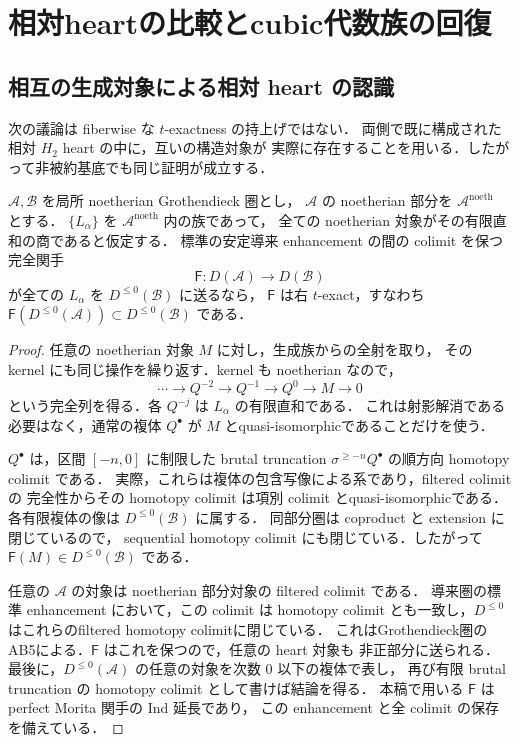 \section{相対heartの比較とcubic代数族の回復}
\label{sec:qa-relative-avatar-heart-comparison}

\subsection{相互の生成対象による相対 heart の認識}
\label{subsec:qa-relative-mutual-heart-recognition}

次の議論は fiberwise な $t$-exactness の持上げではない．
両側で既に構成された相対 $H_2$ heart の中に，互いの構造対象が
実際に存在することを用いる．したがって非被約基底でも同じ証明が成立する．

\begin{lemma}[生成族に対する非正性の検出]
\label{lem:qa-generators-detect-right-texactness}
$\mathcal A,\mathcal B$ を局所 noetherian Grothendieck 圏とし，
$\mathcal A$ の noetherian 部分を $\mathcal A^{\mathrm{noeth}}$ とする．
$\{L_\alpha\}$ を $\mathcal A^{\mathrm{noeth}}$ 内の族であって，
全ての noetherian 対象がその有限直和の商であると仮定する．
標準の安定導来 enhancement の間の colimit を保つ完全関手
\[
 \mathsf F:D(\mathcal A)\longrightarrow D(\mathcal B)
\]
が全ての $L_\alpha$ を $D^{\leq0}(\mathcal B)$ に送るなら，
$\mathsf F$ は右 $t$-exact，すなわち
$\mathsf F(D^{\leq0}(\mathcal A))\subset D^{\leq0}(\mathcal B)$ である．
\end{lemma}
\begin{proof}
任意の noetherian 対象 $M$ に対し，生成族からの全射を取り，
その kernel にも同じ操作を繰り返す．kernel も noetherian なので，
\[
 \cdots\longrightarrow Q^{-2}\longrightarrow Q^{-1}
       \longrightarrow Q^0\longrightarrow M\longrightarrow0
\]
という完全列を得る．各 $Q^{-j}$ は $L_\alpha$ の有限直和である．
これは射影解消である必要はなく，通常の複体 $Q^\bullet$ が
$M$ とquasi-isomorphicであることだけを使う．

$Q^\bullet$ は，区間 $[-n,0]$ に制限した brutal truncation
$\sigma^{\geq-n}Q^\bullet$ の順方向 homotopy colimit である．
実際，これらは複体の包含写像による系であり，filtered colimit の
完全性からその homotopy colimit は項別 colimit とquasi-isomorphicである．
各有限複体の像は $D^{\leq0}(\mathcal B)$ に属する．
同部分圏は coproduct と extension に閉じているので，
sequential homotopy colimit にも閉じている．したがって
$\mathsf F(M)\in D^{\leq0}(\mathcal B)$ である．

任意の $\mathcal A$ の対象は noetherian 部分対象の filtered colimit である．
導来圏の標準 enhancement において，この colimit は homotopy colimit
とも一致し，$D^{\leq0}$ はこれらのfiltered homotopy colimitに閉じている．
これはGrothendieck圏のAB5による．$\mathsf F$ はこれを保つので，任意の heart 対象も
非正部分に送られる．
最後に，$D^{\leq0}(\mathcal A)$ の任意の対象を次数 $0$ 以下の複体で表し，
再び有限 brutal truncation の homotopy colimit として書けば結論を得る．
本稿で用いる $\mathsf F$ は perfect Morita 関手の Ind 延長であり，
この enhancement と全 colimit の保存を備えている．
\end{proof}

